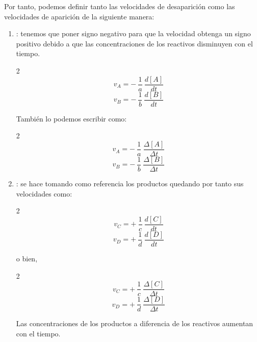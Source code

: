 Por tanto, podemos definir tanto las velocidades de desaparición como las velocidades de aparición de la siguiente manera:
\begin{enumerate}[label=\numberballmDarkTeal]
        \item {}: tenemos que poner signo negativo para que la velocidad obtenga un signo positivo debido a que las concentraciones de los reactivos disminuyen con el tiempo.
        \begin{paracol}{2}
            \begin{equation}
                v_A = -\ \dfrac{1}{a}\ \dfrac{d[A]}{dt}\label{eq:velocidad-a}
            \end{equation}
            \switchcolumn
            \begin{equation}
                v_B = -\ \dfrac{1}{b}\ \dfrac{d[B]}{dt}\label{eq:velocidadb}
            \end{equation}
        \end{paracol}
        También lo podemos escribir como:
        \begin{paracol}{2}
            \begin{equation}
                v_A = -\ \dfrac{1}{a}\ \dfrac{\Delta[A]}{\Delta t}\label{eq:velocidad-a-incremento}
            \end{equation}
            \switchcolumn
            \begin{equation}
                v_B = -\ \dfrac{1}{b}\ \dfrac{\Delta[B]}{\Delta t}\label{eq:velicudad-b-incremento}
            \end{equation}
        \end{paracol}
        \item {}: se hace tomando como referencia los productos quedando por tanto sus velocidades como:
        \begin{paracol}{2}
            \begin{equation}
                v_C = +\ \dfrac{1}{c}\ \dfrac{d[C]}{dt}\label{eq:velocidad-c}
            \end{equation}
            \switchcolumn
            \begin{equation}
                v_D= +\ \dfrac{1}{d}\ \dfrac{d[D]}{dt}\label{eq:velocidadd-d}
            \end{equation}
        \end{paracol}
        o bien,
        \begin{paracol}{2}
            \begin{equation}
                v_C = +\ \dfrac{1}{c}\ \dfrac{\Delta[C]}{\Delta t}\label{eq:velocidad-c-incremento}
            \end{equation}
            \switchcolumn
            \begin{equation}
                v_D= +\ \dfrac{1}{d}\ \dfrac{\Delta [D]}{\Delta t}\label{eq:velocidad-d-incremento}
            \end{equation}
        \end{paracol}
        Las concentraciones de los productos a diferencia de los reactivos aumentan con el tiempo.
\end{enumerate}
